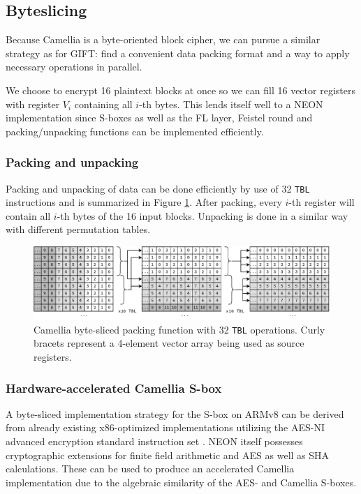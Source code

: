 \subsection{Byteslicing}

Because Camellia is a byte-oriented block cipher, we can pursue a similar
strategy as for GIFT: find a convenient data packing format and a way to apply
necessary operations in parallel.

We choose to encrypt 16 plaintext blocks at once so we can fill 16 vector
registers with register $V_i$ containing all $i$-th bytes. This lends itself well
to a NEON implementation since S-boxes as well as the FL layer, Feistel round
and packing/unpacking functions can be implemented efficiently.

\subsubsection{Packing and unpacking}

Packing and unpacking of data can be done efficiently by use of 32 \texttt{TBL}
instructions and is summarized in Figure \ref{fig:byteslicing}. After
packing, every $i$-th register will contain all $i$-th bytes of the 16 input
blocks. Unpacking is done in a similar way with different permutation tables.

\begin{figure}[h!]
    \centering
    \includegraphics[width=\textwidth]{Figures/byteslicing.pdf}
    \caption{Camellia byte-sliced packing function with 32 \texttt{TBL} operations.
    Curly bracets represent a 4-element vector array being used as source registers.}
    \label{fig:byteslicing}
\end{figure}

\subsubsection{Hardware-accelerated Camellia S-box}

A byte-sliced implementation strategy for the S-box on ARMv8 can be derived
from already existing x86-optimized implementations utilizing the AES-NI
advanced encryption standard instruction set \cite{bcfastimplx86:2013}. NEON
itself possesses cryptographic extensions for finite field arithmetic and AES
as well as SHA calculations. These can be used to produce an accelerated
Camellia implementation due to the algebraic similarity of the AES- and
Camellia S-boxes.

